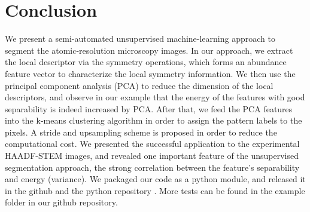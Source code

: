 \documentclass[twocolumn,amsmath, floatfix]{revtex4}
\begin{document}
\section{Conclusion}
We present a semi-automated unsupervised machine-learning approach to segment the atomic-resolution microscopy images. In our approach, we extract the local descriptor via the symmetry operations, which forms an abundance feature vector to characterize the local symmetry information. We then use the principal component analysis (PCA) to reduce the dimension of the local descriptors, and observe in our example that the energy of the features with good separability is indeed increased by PCA. After that, we feed the PCA features into the k-means clustering algorithm in order to assign the pattern labels to the pixels. A stride and upsampling scheme is proposed in order to reduce the computational cost.
We presented the successful application to the experimental HAADF-STEM images, and revealed one important feature of the unsupervised segmentation approach, the strong correlation between the feature's separability and energy (variance).  
We packaged our code as a python module, and released it in the github \cite{github} and the python repository \cite{pystem}. More tests can be found in the example folder in our github repository. 



\end{document}
